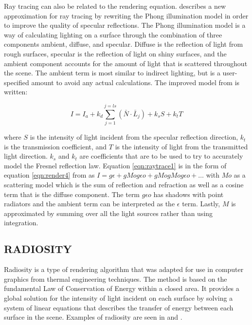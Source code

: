 Ray tracing can also be related to the rendering equation.  \cite{Whitted1980} describes a new approximation for ray tracing by rewriting the Phong illumination model in order to improve the quality of specular reflections.  The Phong illumination model is a way of calculating lighting on a surface through the combination of three components ambient, diffuse, and specular.  Diffuse is the reflection of light from rough surfaces, specular is the reflection of light on shiny surfaces, and the ambient component accounts for the amount of light that is scattered throughout the scene.  The ambient term is most similar to indirect lighting, but is a user-specified amount to avoid any actual calculations.  The improved model from \cite{Whitted1980} is written:

\begin{equation}
I = I_{a} + k_{d}\sum_{j=1}^{j=ls}(\bar{N}\cdot\bar{L}_{j})+k_{s}S + k_{t}T \label{eqn:raytrace1}
\end{equation}

where $S$ is the intensity of light incident from the specular reflection direction, $k_{t}$ is the transmission coefficient, and $T$ is the intensity of light from the transmitted light direction. $k_{s}$ and $k_{t}$ are coefficients that are to be used to try to accurately model the Fresnel reflection law.  Equation \ref{eqn:raytrace1} is in the form of equation \ref{eqn:render4} from \cite{Kajiya1986} as $I =  g\epsilon +gMog\epsilon o +gMogMog\epsilon o + … $ with $Mo$ as a scattering model which is the sum of reflection and refraction as well as a cosine term that is the diffuse component. The term $g\epsilon o$ has shadows with point radiators and the ambient term can be interpreted as the $\epsilon$ term.  Lastly, $M$ is approximated by summing over all the light sources rather than using integration.

\subsection{RADIOSITY}

Radiosity is a type of rendering algorithm that was adapted for use in computer graphics from thermal engineering techniques.  The method is based on the fundamental Law of Conservation of Energy within a closed area.  It provides a global solution for the intensity of light incident on each surface by solving a system of linear equations that describes the transfer of energy between each surface in the scene.  Examples of radiosity are seen in \cite{Immel1986} and \cite{Goral1984}.

